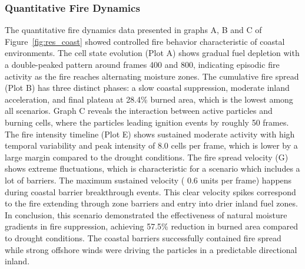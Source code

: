 \subsubsection{Quantitative Fire Dynamics}
The quantitative fire dynamics data presented in graphs A, B and C of Figure~\ref{fig:res_coast} showed controlled fire behavior characteristic of coastal environments. The cell state evolution (Plot A) shows gradual fuel depletion with a double-peaked pattern around frames 400 and 800, indicating episodic fire activity as the fire reaches alternating moisture zones. The cumulative fire spread (Plot B) has three distinct phases: a slow coastal suppression, moderate inland acceleration, and final plateau at 28.4\% burned area, which is the lowest among all scenarios. \newline
\newline
Graph C reveals the interaction between active particles and burning cells, where the particles leading ignition events by roughly 50 frames. The fire intensity timeline (Plot E) shows sustained moderate activity with high temporal variability and peak intensity of 8.0 cells per frame, which is lower by a large margin compared to the drought conditions.\newline
\newline
The fire spread velocity (G) shows extreme fluctuations, which is characteristic for a scenario which includes a lot of barriers. The maximum sustained velocity ( 0.6 units per frame) happens during coastal barrier breakthrough events. This clear velocity spikes correspond to the fire extending through zone barriers and entry into drier inland fuel zones.\newline
\newline
In conclusion, this scenario demonstrated the effectiveness of natural moisture gradients in fire suppression, achieving 57.5\% reduction in burned area compared to drought conditions. The coastal barriers successfully contained  fire spread while strong offshore winds were driving the particles in a predictable directional inland.
